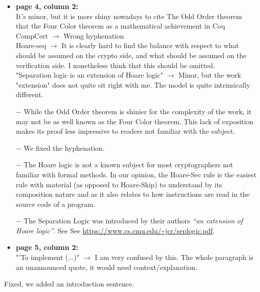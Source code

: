 \begin{itemize}
  \item \textbf{page 4, column 2:}\\
        It's minor, but it is more shiny nowadays to cite The Odd Order theorem that the Four Color theorem as a mathematical achievement in Coq\\
        CompCert $\rightarrow$ Wrong hyphenation\\
        Hoare-seq $\rightarrow$ It is clearly hard to find the balance with respect to what should be assumed on the crypto side, and what should be assumed on the verification side. I nonetheless think that this should be omitted.\\
        "Separation logic is an extension of Hoare logic" $\rightarrow$ Minor, but the work "extension" does not quite sit right with me. The model is quite intrinsically different.
\end{itemize}
\begin{answer}
  \begin{itemize}
    \item[$-$] While the Odd Order theorem is shinier for the complexity of the work, it may not be as well known as the Four Color theorem. This lack of exposition makes its proof less impressive to readers not familiar with the subject.
    \item[$-$] We fixed the hyphenation.
    \item[$-$] The Hoare logic is not a known subject for most cryptographers not familiar with formal methods. In our opinion, the Hoare-Sec rule is the easiest rule with material (as opposed to Hoare-Skip) to understand by its composition nature and as it also relates to how instructions are read in the source code of a program.
    \item[$-$] The Separation Logic was introduced by their authors \emph{``an extension of Hoare logic''}. See See \url{https://www.cs.cmu.edu/~jcr/seplogic.pdf}.
  \end{itemize}

\end{answer}

\begin{itemize}
  \item \textbf{page 5, column 2:}\\
        "'To implement (...)" $\rightarrow$ I am very confused by this. The whole paragraph is an unannounced quote, it would need context/explanation.
\end{itemize}
\begin{answer}
  Fixed, we added an introduction sentence.
\end{answer}


